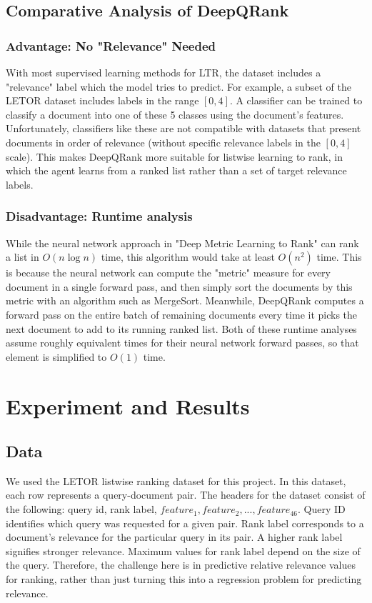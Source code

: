 \documentclass{article}
\begin{document}
\subsection{Comparative Analysis of DeepQRank}
\subsubsection{Advantage: No "Relevance" Needed}
With most supervised learning methods for LTR, the dataset includes a "relevance" label which the model tries to predict. For example, a subset of the LETOR dataset includes labels in the range $[0,4]$. A classifier can be trained to classify a document into one of these 5 classes using the document's features. Unfortunately, classifiers like these are not compatible with datasets that present documents in order of relevance (without specific relevance labels in the $[0,4]$ scale). This makes DeepQRank more suitable for listwise learning to rank, in which the agent learns from a ranked list rather than a set of target relevance labels. 
\subsubsection{Disadvantage: Runtime analysis}
While the neural network approach in "Deep Metric Learning to Rank" can rank a list in $O(n\log n)$ time, this algorithm would take at least $O(n^2)$ time. This is because the neural network can compute the "metric" measure for every document in a single forward pass, and then simply sort the documents by this metric with an algorithm such as MergeSort. Meanwhile, DeepQRank computes a forward pass on the entire batch of remaining documents every time it picks the next document to add to its running ranked list. Both of these runtime analyses assume roughly equivalent times for their neural network forward passes, so that element is simplified to $O(1)$ time.


\section{Experiment and Results}

\subsection{Data}
We used the LETOR listwise ranking dataset for this project. In this dataset, each row represents a query-document pair. The headers for the dataset consist of the following: query id, rank label, $feature_1, feature_2, ..., feature_{46}$. Query ID identifies which query was requested for a given pair. Rank label corresponds to a document's relevance for the particular query in its pair. A higher rank label signifies stronger relevance. Maximum values for rank label depend on the size of the query. Therefore, the challenge here is in predictive relative relevance values for ranking, rather than just turning this into a regression problem for predicting relevance. 
\end{document}

